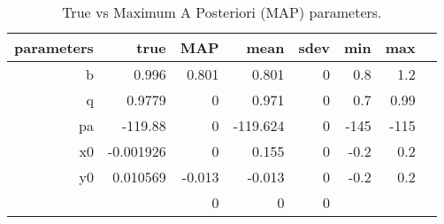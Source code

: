 \begin{table*}[!htb]\caption{True vs Maximum A Posteriori (MAP) parameters.}\begin{center}\begin{tabular}{ r r r r r r r r } parameters & true & MAP & mean & sdev & min & max \\ 
\hline b & 0.996 & 0.801 & 0.801 & 0 & 0.8 & 1.2 \\ 
 q & 0.9779 & 0 & 0.971 & 0 & 0.7 & 0.99 \\ 
 pa & -119.88 & 0 & -119.624 & 0 & -145 & -115 \\ 
 x0 & -0.001926 & 0 & 0.155 & 0 & -0.2 & 0.2 \\ 
 y0 & 0.010569 & -0.013 & -0.013 & 0 & -0.2 & 0.2 \\ 
  &  & 0 & 0 & 0 &  &  \\ 
\hline\end{tabular}\end{center}\label{tab:1}\end{table*}